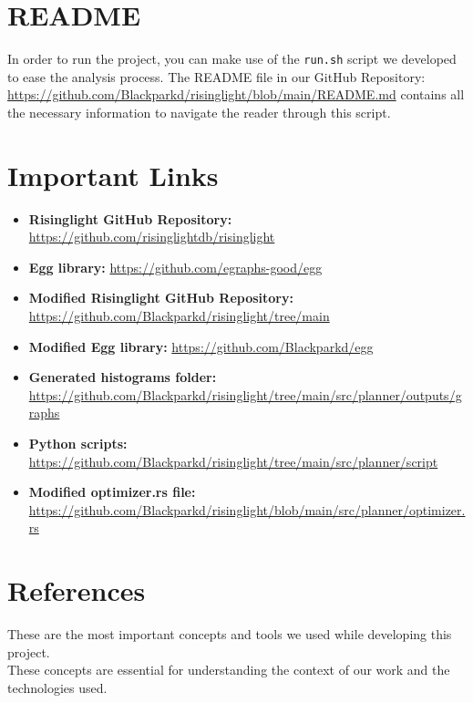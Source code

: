 \documentclass[a4paper,12pt]{scrreprt}
\begin{document}
\section{README}

In order to run the project, you can make use of the \texttt{run.sh} script we developed to ease the analysis process. The README file in our GitHub Repository: \url{https://github.com/Blackparkd/risinglight/blob/main/README.md} contains all the necessary information to navigate the reader through this script. \\

\section{Important Links}
\begin{itemize}
    \item \textbf{Risinglight GitHub Repository:} \url{https://github.com/risinglightdb/risinglight}
    \item \textbf{Egg library:} \url{https://github.com/egraphs-good/egg}
    \item \textbf{Modified Risinglight GitHub Repository:} \url{https://github.com/Blackparkd/risinglight/tree/main}
    \item \textbf{Modified Egg library:} \url{https://github.com/Blackparkd/egg}
    \item \textbf{Generated histograms folder:} \url{https://github.com/Blackparkd/risinglight/tree/main/src/planner/outputs/graphs}
    \item \textbf{Python scripts:} \url{https://github.com/Blackparkd/risinglight/tree/main/src/planner/script}
    \item \textbf{Modified optimizer.rs file:} \url{https://github.com/Blackparkd/risinglight/blob/main/src/planner/optimizer.rs}
\end{itemize}

\section{References}
These are the most important concepts and tools we used while developing this project. \\
These concepts are essential for understanding the context of our work and the technologies used.
\end{document}
